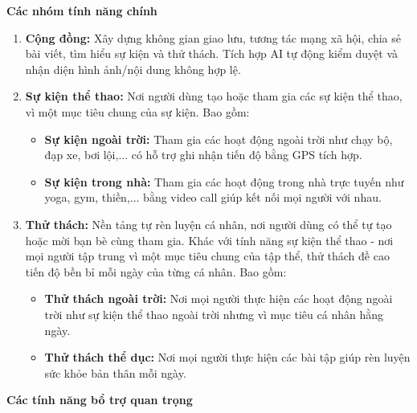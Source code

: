 \textbf{Các nhóm tính năng chính}
\begin{enumerate}
    \item \textbf{Cộng đồng:} Xây dựng không gian giao lưu, tương tác mạng xã hội, chia sẻ bài viết, tìm hiểu sự kiện và thử thách. Tích hợp AI tự động kiểm duyệt và nhận diện hình ảnh/nội dung không hợp lệ.

    \item \textbf{Sự kiện thể thao:} Nơi người dùng tạo hoặc tham gia các sự kiện thể thao, vì một mục tiêu chung của sự kiện. Bao gồm:
    \begin{itemize}
        \item \textbf{Sự kiện ngoài trời:} Tham gia các hoạt động ngoài trời như chạy bộ, đạp xe, bơi lội,... có hỗ trợ ghi nhận tiến độ bằng GPS tích hợp. 
        \item \textbf{Sự kiện trong nhà:} Tham gia các hoạt động trong nhà trực tuyến như yoga, gym, thiền,... bằng video call giúp kết nối mọi người với nhau.
    \end{itemize}

    \item \textbf{Thử thách:} Nền tảng tự rèn luyện cá nhân, nơi người dùng có thể tự tạo hoặc mời bạn bè cùng tham gia. Khác với tính năng sự kiện thể thao - nơi mọi người tập trung vì một mục tiêu chung của tập thể, thử thách đề cao tiến độ bền bỉ mỗi ngày của từng cá nhân. Bao gồm:
    \begin{itemize}
        \item \textbf{Thử thách ngoài trời:} Nơi mọi người thực hiện các hoạt động ngoài trời như sự kiện thể thao ngoài trời nhưng vì mục tiêu cá nhân hằng ngày.
        \item \textbf{Thử thách thể dục:} Nơi mọi người thực hiện các bài tập giúp rèn luyện sức khỏe bản thân mỗi ngày.
    \end{itemize}
\end{enumerate}

\textbf{Các tính năng bổ trợ quan trọng}

